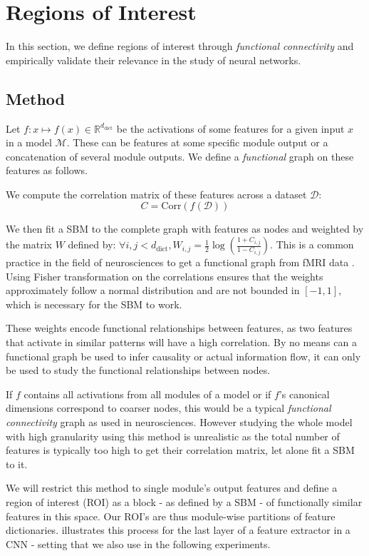 \documentclass{article}
\newcommand{\R}{\mathbb{R}}
\begin{document}
\section{Regions of Interest}
\label{sec:ROI}

In this section, we define regions of interest through \textit{functional connectivity} and empirically validate their relevance in the study of neural networks.

\subsection{Method}
\label{sec:ROI_definition}

Let $f : x \mapsto f(x) \in \R^{d_{\mathrm{dict}}}$ be the activations of some features for a given input $x$ in a model $\mathcal{M}$. These can be features at some specific module output or a concatenation of several module outputs. We define a \textit{functional} graph on these features as follows.

We compute the correlation matrix of these features across a dataset $\mathcal{D}$:
$$C = \mathrm{Corr}(f(\mathcal{D}))$$

We then fit a SBM to the complete graph with features as nodes and weighted by the matrix $W$ defined by: $\forall i, j < d_{\mathrm{dict}}, W_{i,j} = \frac{1}{2} \log\left(\frac{1 + C_{i,j}}{1 - C_{i,j}}\right)$. This is a common practice in the field of neurosciences to get a functional graph from fMRI data \citep{peixoto2018nonparametric}. Using Fisher transformation on the correlations ensures that the weights approximately follow a normal distribution and are not bounded in $[-1, 1]$, which is necessary for the SBM to work.

These weights encode functional relationships between features, as two features that activate in similar patterns will have a high correlation. By no means can a functional graph be used to infer causality or actual information flow, it can only be used to study the functional relationships between nodes.

If $f$ contains all activations from all modules of a model or if $f$'s canonical dimensions correspond to coarser nodes, this would be a typical \textit{functional connectivity} graph as used in neurosciences. However studying the whole model with high granularity using this method is unrealistic as the total number of features is typically too high to get their correlation matrix, let alone fit a SBM to it.

We will restrict this method to single module's output features and define a region of interest (ROI) as a block - as defined by a SBM - of functionally similar features in this space. Our ROI's are thus module-wise partitions of feature dictionaries.  illustrates this process for the last layer of a feature extractor in a CNN - setting that we also use in the following experiments.\\
\end{document}
